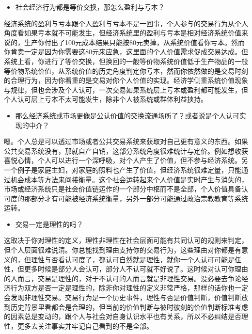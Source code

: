 \documentclass[
  letterpaper,
  DIV=11,
  numbers=noendperiod]{scrreprt}
\providecommand{\tightlist}{%
  \setlength{\itemsep}{0pt}\setlength{\parskip}{0pt}}\usepackage{longtable,booktabs,array}
\begin{document}
\begin{itemize}
\tightlist
\item
  社会经济行为都是等价交换，那怎么盈利与亏本？
\end{itemize}

经济系统的盈利与亏本跟个人盈利与亏本不是一回事，个人参与的交易行为从个人角度看如果亏本就不可能发生，但经济系统里的盈利与亏本是相对经济系统价值来说的，生产你付出了100元成本结果只能按80元卖掉，从系统价值看你亏本。然而你肯卖一定是因为你需要这80元来应急，这里面的个人价值需求促成交易达成。但系统上看，你进行了等价交换，但换回的一般等价物系统价值低于生产物品的一般等价物系统价值，从系统价值的历史角度判定你亏本，然而你依然做的是交易时刻的合理行为，因为你看重的是交易对你个人价值的实现。经济学侧重系统价值现象与规律，但也会涉及个人认可，一次交易如果系统层上亏本或盈利都可能发生，但个人认可层上亏本不太可能发生，除非个人被系统或群体利益挟持。

\begin{itemize}
\tightlist
\item
  那么经济系统或市场更像是公认价值的交换流通场所了？或者说是个人认可实现的中介？
\end{itemize}

嗯。个人总是可以透过市场或者公共交易系统来获取对自己更有意义的东西。如果公共交易系统没有，那就自产自销，这部分系统角度很难统计与定价。例如想收获喜悦心情，个人可以进行一个深呼吸，对个人产生了价值，但不参与经济系统。另一个例子是家庭主妇，对家庭的照料也产生了价值，但经济系统很难定量，只能通过机会成本等方法来间接衡量。这个社会运转起来个人价值是实时产生与消失的，市场或经济系统只是社会价值链运作的一个部分中枢而不是全部，个人价值具备认可度的那部分才有可能被经济系统衡量，另外一部分可能通过政治宗教教育等系统运转。

\begin{itemize}
\tightlist
\item
  交易一定是理性的吗？
\end{itemize}

这取决于你对理性的定义，理性非理性在社会层面可能有共同认可的规则来判定，但个人层面很难说清。你总能找到理由支持你的交易行为，这些理由对你都是有意义的，但理性与否看认可度了，都认可自然就是理性，就你一个人认可可能是任性，但更多时候是部分人会认可，部分人不认可就不好说了。这时候对认可你理由的人而言，交易是理性的，对于不认可的人而言就是非理性交易。没必要去争论经济行为双方是否一定是理性的，除非你对理性的定义非常严格，那样的话你也一定会发现非理性交易。交易行为是一个历史事件，理性与否是价值判断，价值判断放到历史背景里看都会是合理的，但当前的价值判断与彼时彼刻的价值判断标准考虑的因素总是变动的，跟个人与社会对自身认识水平也有关系，所以不必纠结是否理性，更多去关注事实并牢记自己看到的不是全部。
\end{document}
